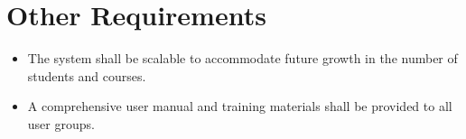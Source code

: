 \documentclass[11pt, a4paper]{article}
\begin{document}
\section{Other Requirements}
\label{sec:other}
\begin{itemize}
    \item The system shall be scalable to accommodate future growth in the number of students and courses.
    \item A comprehensive user manual and training materials shall be provided to all user groups.
\end{itemize}
\end{document}
